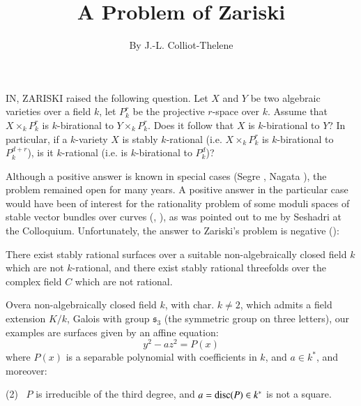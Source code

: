 \title{A Problem of Zariski}\label{chap4}

\author{By J.-L. Colliot-Thelene}

\date{}
\maketitle

\setcounter{page}{93}

\setcounter{pageoriginal}{126}
IN, ZARISKI raised the following question. Let $X$
and $Y$ be two algebraic varieties over a field $k$, let $P^{r}_{k}$
be the projective $r$-space over $k$. Assume that
$X\times_{k}P^{r}_{k}$ is $k$-birational to
$Y\times_{k}P^{r}_{k}$. Does it follow that $X$ is $k$-birational to
$Y$? In particular, if a $k$-variety $X$ is stably $k$-rational
(i.e. $X\times_{k}P^{r}_{k}$ is $k$-birational to $P^{d+r}_{k}$), is
it $k$-rational (i.e. is $k$-birational to $P^{d}_{k}$)? 

Although a positive answer is known in special cases
(Segre \cite{chap4-key13}, Nagata \cite{chap4-key11}), the problem
remained open for many years. A positive answer in the particular case
would have been of interest for the rationality problem of some moduli
spaces of stable vector bundles over curves
(\cite{chap4-key12}, \cite{chap4-key1}), as was pointed out to me by
Seshadri at the Colloquium. Unfortunately, the answer to Zariski's
problem is negative (\cite{chap4-key4}):

There exist stably rational surfaces over a suitable non-algebraically
closed field $k$ which are not $k$-rational, and there exist stably
rational threefolds over the complex field $C$ which are not
rational. 

Over\pageoriginale a non-algebraically closed field $k$, with
char. $k\neq 2$, which admits a field extension $K/k$, Galois with
group $\mathfrak{s}_{3}$ (the symmetric group on three letters), our
examples are surfaces given by an affine equation:
\begin{equation}
y^{2}-az^{2}=P(x)\label{chap4-eq1}
\end{equation}
where $P(x)$ is a separable polynomial with coefficients in $k$, and
$a\in k^{*}$, and moreover:

(2)~ $P$ is irreducible of the third degree, and $a=\operatorname{disc} (P)\in
k^{*}$ is not a square.

